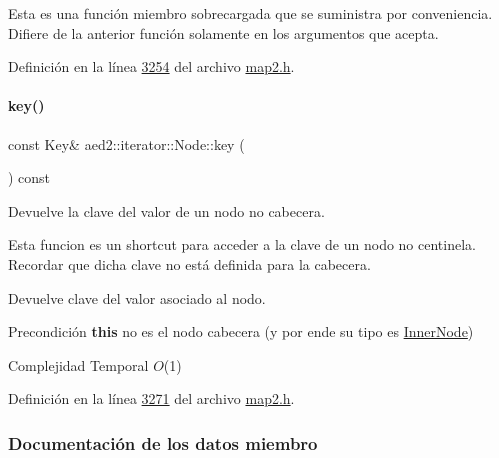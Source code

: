 Esta es una función miembro sobrecargada que se suministra por conveniencia. Difiere de la anterior función solamente en los argumentos que acepta. 

Definición en la línea \hyperlink{map2_8h_source_l03254}{3254} del archivo \hyperlink{map2_8h_source}{map2.\+h}.

\mbox{\label{structaed2_1_1iterator_1_1Node_ac97fa35ede63ba3d4ba1988b5f16cc00_ac97fa35ede63ba3d4ba1988b5f16cc00}} 
\paragraph{\texorpdfstring{key()}{key()}}
{\footnotesize\ttfamily const Key\& aed2\+::iterator\+::\+Node\+::key (\begin{DoxyParamCaption}{ }\end{DoxyParamCaption}) const\hspace{0.3cm}{\ttfamily [inline]}}



Devuelve la clave del valor de un nodo no cabecera. 

Esta funcion es un shortcut para acceder a la clave de un nodo no centinela. Recordar que dicha clave no está definida para la cabecera.

\begin{DoxyReturn}{Devuelve}
clave del valor asociado al nodo.
\end{DoxyReturn}
\begin{DoxyPrecond}{Precondición}
{\bfseries this} no es el nodo cabecera (y por ende su tipo es \hyperlink{structaed2_1_1iterator_1_1InnerNode}{Inner\+Node})
\end{DoxyPrecond}

\begin{DoxyDescription}
\item[Complejidad Temporal]$O$(1)
\end{DoxyDescription}

Definición en la línea \hyperlink{map2_8h_source_l03271}{3271} del archivo \hyperlink{map2_8h_source}{map2.\+h}.



\subsubsection{Documentación de los datos miembro}
\mbox{\label{structaed2_1_1iterator_1_1Node_aaf0597e2d3402329e0c30db030777f04_aaf0597e2d3402329e0c30db030777f04}} 
